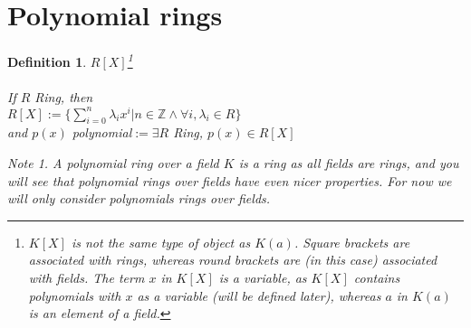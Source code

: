 \documentclass{article}
\theoremstyle{definitionstyle}
\newtheorem{defn}{Definition}[section]
\theoremstyle{lemmastyle}
\theoremstyle{remark}
\newtheorem*{note}{Note}
\begin{document}
\section{Polynomial rings}
\begin{defn}$R[X]$\footnote{ $K[X]$ is not the same type of object as $K(a)$. Square brackets are associated with rings, whereas round brackets are (in this case) associated with fields. The term $x$ in $K[X]$ is a variable, as $K[X]$ contains polynomials with $x$ as a variable (will be defined later), whereas $a$ in $K(a)$ is an element of a field.}\\
\\
If $R$ Ring, then\\

$R[X]:=\{\sum_{i=0}^{n} \lambda_i x^{i} | n \in \mathbb{Z} \land \forall i, \lambda_i \in R\}$\\

and $p(x)$ polynomial$:= \exists R$ Ring, $p(x) \in R[X]$
\begin{note} A polynomial ring over a field $K$ is a ring as all fields are rings, and you will see that polynomial rings over fields have even nicer properties. For now we will only consider polynomials rings over fields.\end{note} \end{defn}
\end{document}

